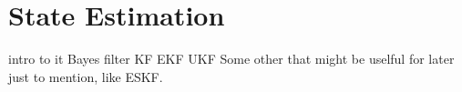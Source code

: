 \section{State Estimation}

intro to it
Bayes filter
KF
EKF
UKF
Some other that might be uselful for later just to mention, like ESKF.